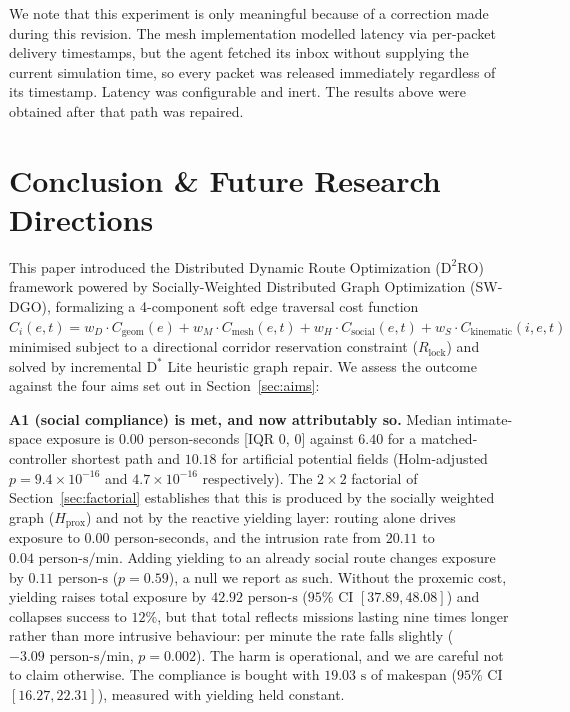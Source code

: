 \documentclass[journal]{IEEEtran}
\begin{document}
We note that this experiment is only meaningful because of a correction made during
this revision. The mesh implementation modelled latency via per-packet delivery
timestamps, but the agent fetched its inbox without supplying the current simulation
time, so every packet was released immediately regardless of its timestamp. Latency
was configurable and inert. The results above were obtained after that path was
repaired.

\section{Conclusion \& Future Research Directions}
This paper introduced the Distributed Dynamic Route Optimization ($\text{D}^2\text{RO}$) framework powered by Socially-Weighted Distributed Graph Optimization (SW-DGO), formalizing a 4-component soft edge traversal cost function $C_i(e, t) = w_D \cdot C_{\text{geom}}(e) + w_M \cdot C_{\text{mesh}}(e, t) + w_H \cdot C_{\text{social}}(e, t) + w_S \cdot C_{\text{kinematic}}(i, e, t)$ minimised subject to a directional corridor reservation constraint ($R_{\text{lock}}$) and solved by incremental $\text{D}^*$ Lite heuristic graph repair. We assess the outcome against the four aims set out in Section~\ref{sec:aims}:

\textbf{A1 (social compliance) is met, and now attributably so.} Median intimate-space exposure is $0.00$ person-seconds [IQR $0$, $0$] against $6.40$ for a matched-controller shortest path and $10.18$ for artificial potential fields (Holm-adjusted $p = 9.4 \times 10^{-16}$ and $4.7 \times 10^{-16}$ respectively). The $2\times2$ factorial of Section~\ref{sec:factorial} establishes that this is produced by the socially weighted graph ($H_{\text{prox}}$) and not by the reactive yielding layer: routing alone drives exposure to $0.00$ person-seconds, and the intrusion rate from $20.11$ to $0.04\text{ person-s/min}$. Adding yielding to an already social route changes exposure by $0.11\text{ person-s}$ ($p = 0.59$), a null we report as such. Without the proxemic cost, yielding raises total exposure by $42.92\text{ person-s}$ ($95\%$ CI $[37.89, 48.08]$) and collapses success to $12\%$, but that total reflects missions lasting nine times longer rather than more intrusive behaviour: per minute the rate falls slightly ($-3.09\text{ person-s/min}$, $p = 0.002$). The harm is operational, and we are careful not to claim otherwise. The compliance is bought with $19.03\text{ s}$ of makespan ($95\%$ CI $[16.27, 22.31]$), measured with yielding held constant.
\end{document}
